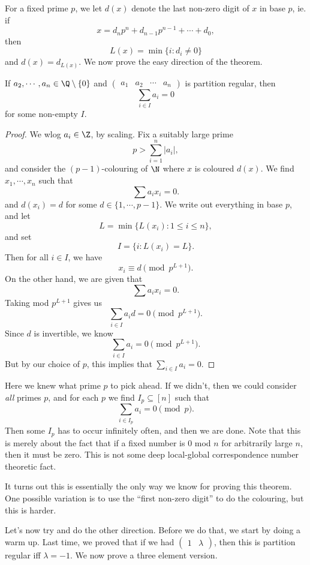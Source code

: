 \documentclass[a4paper]{article}
\begin{document}
For a fixed prime $p$, we let $d(x)$ denote the last non-zero digit of $x$ in base $p$, ie. if
\[
  x = d_n p^n + d_{n - 1}p^{n - 1} + \cdots + d_0,
\]
then
\[
  L(x) = \min\{i: d_i \not= 0\}
\]
and $d(x) = d_{L(x)}$. We now prove the easy direction of the theorem.

\begin{prop}
  If $a_2, \cdots, a_n \in \Q \setminus \{0\}$ and $\begin{pmatrix}a_1 & a_2 & \cdots & a_n\end{pmatrix}$ is partition regular, then
  \[
    \sum_{i \in I} a_i = 0
  \]
  for some non-empty $I$.
\end{prop}

\begin{proof}
  We wlog $a_i \in \Z$, by scaling. Fix a suitably large prime
  \[
    p > \sum_{i = 1}^n |a_i|,
  \]
  and consider the $(p - 1)$-colouring of $\N$ where $x$ is coloured $d(x)$. We find $x_1, \cdots, x_n$ such that
  \[
    \sum a_i x_i = 0.
  \]
  and $d(x_i) = d$ for some $d \in \{1, \cdots, p - 1\}$. We write out everything in base $p$, and let
  \[
    L = \min \{L(x_i): 1 \leq i \leq n\},
  \]
  and set
  \[
    I = \{i: L(x_i) = L\}.
  \]
  Then for all $i \in I$, we have
  \[
    x_i \equiv d \pmod {p^{L + 1}}.
  \]
  On the other hand, we are given that
  \[
    \sum a_i x_i = 0.
  \]
  Taking mod $p^{L + 1}$ gives us
  \[
    \sum_{i \in I} a_i d = 0 \pmod {p^{L + 1}}.
  \]
  Since $d$ is invertible, we know
  \[
    \sum_{i \in I} a_i = 0 \pmod {p^{L + 1}}.
  \]
  But by our choice of $p$, this implies that $\sum_{i \in I} a_i = 0$.
\end{proof}
Here we knew what prime $p$ to pick ahead. If we didn't, then we could consider \emph{all} primes $p$, and for each $p$ we find $I_p \subseteq [n]$ such that
\[
  \sum_{i \in I_p} a_i = 0 \pmod p.
\]
Then some $I_p$ has to occur infinitely often, and then we are done. Note that this is merely about the fact that if a fixed number is $0$ mod $n$ for arbitrarily large $n$, then it must be zero. This is not some deep local-global correspondence number theoretic fact.

It turns out this is essentially the only way we know for proving this theorem. One possible variation is to use the ``first non-zero digit'' to do the colouring, but this is harder.

Let's now try and do the other direction. Before we do that, we start by doing a warm up. Last time, we proved that if we had $\begin{pmatrix}1 & \lambda\end{pmatrix}$, then this is partition regular iff $\lambda = -1$. We now prove a three element version.
\end{document}
